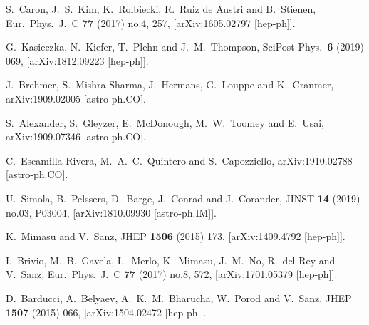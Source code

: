 \documentclass[prd,aps,letterpaper,floatfix,superscriptaddress,preprintnumbers,twocolumn,10pt,nofootinbib]{revtex4-1}
\begin{document}
\begin{thebibliography}{99}
  S.~Caron, J.~S.~Kim, K.~Rolbiecki, R.~Ruiz de Austri and B.~Stienen,
  Eur.\ Phys.\ J.\ C {\bf 77} (2017) no.4,  257,
  [arXiv:1605.02797 [hep-ph]].   



  G.~Kasieczka, N.~Kiefer, T.~Plehn and J.~M.~Thompson,
  SciPost Phys.\  {\bf 6} (2019) 069,
  [arXiv:1812.09223 [hep-ph]].  

  J.~Brehmer, S.~Mishra-Sharma, J.~Hermans, G.~Louppe and K.~Cranmer,
  arXiv:1909.02005 [astro-ph.CO].


  S.~Alexander, S.~Gleyzer, E.~McDonough, M.~W.~Toomey and E.~Usai,
  arXiv:1909.07346 [astro-ph.CO].

  C.~Escamilla-Rivera, M.~A.~C.~Quintero and S.~Capozziello,
  arXiv:1910.02788 [astro-ph.CO].
  
  U.~Simola, B.~Pelssers, D.~Barge, J.~Conrad and J.~Corander,
  JINST {\bf 14} (2019) no.03,  P03004,
  [arXiv:1810.09930 [astro-ph.IM]].  
  
  K.~Mimasu and V.~Sanz,
  JHEP {\bf 1506} (2015) 173,
  [arXiv:1409.4792 [hep-ph]].

  I.~Brivio, M.~B.~Gavela, L.~Merlo, K.~Mimasu, J.~M.~No, R.~del Rey and V.~Sanz,
  Eur.\ Phys.\ J.\ C {\bf 77} (2017) no.8,  572,
  [arXiv:1701.05379 [hep-ph]].

  D.~Barducci, A.~Belyaev, A.~K.~M.~Bharucha, W.~Porod and V.~Sanz,
  JHEP {\bf 1507} (2015) 066,
  [arXiv:1504.02472 [hep-ph]].


\end{thebibliography}
\end{document}
